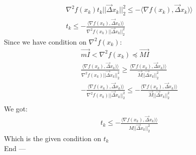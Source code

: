 \documentclass[12pt,twoside]{article}
\begin{document}
\begin{enumerate}[a)]
\begin{align}
\nabla^2 f(x_k)t_k||\vec{\Delta}x_k||_2^2 \leq - \langle\nabla f(x_k), \vec{\Delta}x_k)\rangle\\
t_k \leq - \frac{\langle\nabla f(x_k), \vec{\Delta}x_k)\rangle}{\nabla^2 f(x_k)||\vec{\Delta}x_k||_2^2}
\end{align}
Since we have condition on $\nabla^2 f(x_k)$:
\begin{align}
\vec{mI} <  \nabla^2 f(x_k) \preceq \vec{MI}\\
\frac{\langle\nabla f(x_k), \vec{\Delta}x_k)\rangle}{\nabla^2 f(x_k)||\vec{\Delta}x_k||_2^2} \geq \frac{\langle\nabla f(x_k), \vec{\Delta}x_k)\rangle}{\vec{M}||\vec{\Delta}x_k||_2^2}\\
- \frac{\langle\nabla f(x_k), \vec{\Delta}x_k)\rangle}{\nabla^2 f(x_k)||\vec{\Delta}x_k||_2^2} \leq - \frac{\langle\nabla f(x_k), \vec{\Delta}x_k)\rangle}{\vec{M}||\vec{\Delta}x_k||_2^2}\\
\end{align}
We got:
\begin{align}
t_k \leq - \frac{\langle\nabla f(x_k), \vec{\Delta}x_k)\rangle}{M||\vec{\Delta}x_k||_2^2}
\end{align}
Which is the given condition on $t_k$\\
End ---



\end{enumerate}
\end{document}

